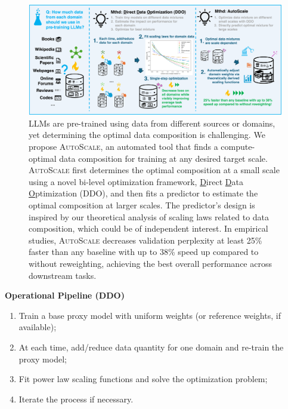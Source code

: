 \documentclass{article} %
\begin{document}
\begin{appendices}{}
\begin{figure}[h!]
\begin{center}
  \includegraphics[width=1.0\textwidth]{figs/main_fig_crop.png}
  \caption{LLMs are pre-trained using data from different sources or domains, yet determining the optimal data composition is challenging. We propose \textsc{AutoScale}, an automated tool that finds a compute-optimal data composition for training at any desired target scale. \textsc{AutoScale} first determines the optimal composition at a small scale using a novel bi-level optimization framework, \underline{D}irect \underline{D}ata \underline{O}ptimization (\textsc{DDO}), and then fits a predictor to estimate the optimal composition at larger scales. The predictor's design is inspired by our theoretical analysis of scaling laws related to data composition, which could be of independent interest. In empirical studies, \textsc{AutoScale} decreases validation perplexity at least 25\% faster than any baseline with up to 38\% speed up compared to without reweighting, achieving the best overall performance across downstream tasks. 
  }\label{fig:example}%
  \end{center}
\end{figure}%

\textbf{Operational Pipeline (\textsc{DDO})}
\begin{enumerate}
\item Train a base proxy model with uniform weights (or reference weights, if available);
\item At each time, add/reduce data quantity for one domain and re-train the proxy model;
\item Fit power law scaling functions and solve the optimization problem;
\item Iterate the process if necessary.
\end{enumerate}




\end{appendices}
\end{document}
